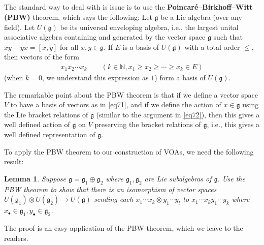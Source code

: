 \documentclass[12pt,a4paper,notitlepage]{article}
\theoremstyle{definition}
\theoremstyle{plain}
\newtheorem{lm}[df]{Lemma}
\newcommand{\fk}{\mathfrak}
\newcommand{\gk}{\mathfrak g}
\newcommand{\blt}{\bullet}
\newcommand{\Nbb}{\mathbb N}
\numberwithin{equation}{section}
\begin{document}
\subsection{}

The standard way to deal with is issue is to use the \textbf{Poincar\'e–Birkhoff–Witt (PBW)} theorem, which says the following: Let $\fk g$ be a Lie algebra (over any field). Let $U(\fk g)$ be its universal enveloping algebra, i.e., the largest unital associative algebra containing and generated by the vector space $\fk g$ such that $xy-yx=[x,y]$ for all $x,y\in\fk g$. If $E$ is a basis of $U(\gk)$ with a total order $\leq$, then vectors of the form
\begin{align}
x_1x_2\cdots x_k\qquad (k\in\Nbb,x_1\geq x_2\geq\cdots\geq x_k\in E)	\label{eq71}
\end{align}
(when $k=0$, we understand this expression as $1$) form a basis of $U(\fk g)$.

The remarkable point about the PBW theorem is that if we define a vector space $V$ to have a basis of vectors as in \eqref{eq71}, and if we define the action of $x\in\fk g$ using the Lie bracket relations of $\fk g$ (similar to the argument in \eqref{eq72}), then this gives a well defined action of $\fk g$ on $V$ preserving the bracket relations of $\fk g$, i.e., this gives a well defined representation of $\fk g$.

To apply the PBW theorem to our construction of VOAs, we need the following result:
\begin{lm}\label{lb46}
Suppose $\gk=\gk_1\oplus\gk_2$ where $\gk_1,\gk_2$ are Lie subalgebras of $\gk$. Use the PBW theorem to show that there is an isomorphism of vector spaces $U(\gk_1)\otimes U(\gk_2)\rightarrow U(\gk)$ sending each $x_1\cdots x_k\otimes y_1\cdots y_l$ to $x_1\cdots x_ky_1\cdots y_k$ where $x_\blt\in\gk_1,y_\blt\in\gk_2$. 
\end{lm}
The proof is an easy application of the PBW theorem, which we leave to the readers.
\end{document}
